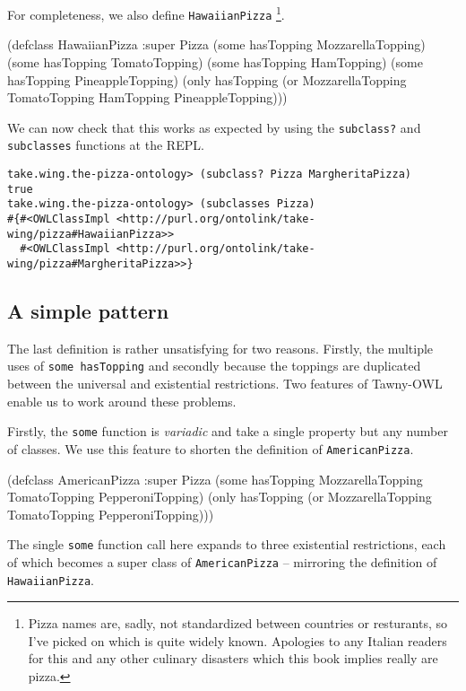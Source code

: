 For completeness, we also define \verb~HawaiianPizza~ \footnote{Pizza names are, sadly,
not standardized between countries or resturants, so I've picked on which is
quite widely known. Apologies to any Italian readers for this and any other
culinary disasters which this book implies really are pizza.}.

\begin{tawny}
(defclass HawaiianPizza
  :super
  Pizza
  (some hasTopping MozzarellaTopping)
  (some hasTopping TomatoTopping)
  (some hasTopping HamTopping)
  (some hasTopping PineappleTopping)
  (only hasTopping
	(or MozzarellaTopping TomatoTopping HamTopping PineappleTopping)))
\end{tawny}

We can now check that this works as expected by using the \verb~subclass?~ and
\verb~subclasses~ functions at the REPL.

\begin{verbatim}
take.wing.the-pizza-ontology> (subclass? Pizza MargheritaPizza)
true
take.wing.the-pizza-ontology> (subclasses Pizza)
#{#<OWLClassImpl <http://purl.org/ontolink/take-wing/pizza#HawaiianPizza>>
  #<OWLClassImpl <http://purl.org/ontolink/take-wing/pizza#MargheritaPizza>>}
\end{verbatim}

\subsection{A simple pattern}
\label{sec-5-6}

The last definition is rather unsatisfying for two reasons. Firstly, the
multiple uses of \verb~some hasTopping~ and secondly because the toppings are
duplicated between the universal and existential restrictions. Two features of
Tawny-OWL enable us to work around these problems. 

Firstly, the \verb~some~ function is \emph{variadic} and take a single property but any
number of classes. We use this feature to shorten the definition of
\verb~AmericanPizza~. 

\begin{tawny}
(defclass AmericanPizza
  :super
  Pizza
  (some hasTopping MozzarellaTopping
	TomatoTopping PepperoniTopping)
  (only hasTopping (or MozzarellaTopping TomatoTopping PepperoniTopping)))
\end{tawny}

The single \verb~some~ function call here expands to three existential
restrictions, each of which becomes a super class of \verb~AmericanPizza~ --
mirroring the definition of \verb~HawaiianPizza~.

